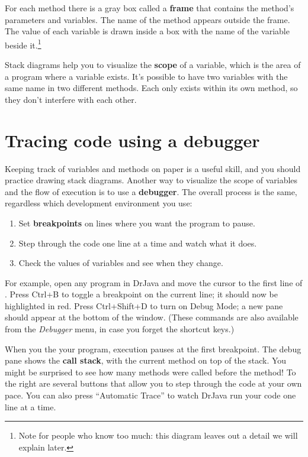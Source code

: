 
For each method there is a gray box called a {\bf frame} that contains the method's parameters and variables.
The name of the method appears outside the frame.
The value of each variable is drawn inside a box with the name of the variable beside it.\footnote{Note for people who know too much: this diagram leaves out a detail we will explain later.}

Stack diagrams help you to visualize the {\bf scope} of a variable, which is the area of a program where a variable exists.
It's possible to have two variables with the same name in two different methods.
Each only exists within its own method, so they don't interfere with each other.


\section{Tracing code using a debugger}


Keeping track of variables and methods on paper is a useful skill, and you should practice drawing stack diagrams.
Another way to visualize the scope of variables and the flow of execution is to use a {\bf debugger}.
The overall process is the same, regardless which development environment you use:


\begin{enumerate}
\item Set {\bf breakpoints} on lines where you want the program to pause.
\item Step through the code one line at a time and watch what it does.
\item Check the values of variables and see when they change.
\end{enumerate}

For example, open any program in DrJava and move the cursor to the first line of .
Press Ctrl+B to toggle a breakpoint on the current line; it should now be highlighted in red.
Press Ctrl+Shift+D to turn on Debug Mode; a new pane should appear at the bottom of the window.
(These commands are also available from the {\em Debugger} menu, in case you forget the shortcut keys.)


When you the your program, execution pauses at the first breakpoint.
The debug pane shows the {\bf call stack}, with the current method on top of the stack.
You might be surprised to see how many methods were called before the  method!
To the right are several buttons that allow you to step through the code at your own pace.
You can also press ``Automatic Trace'' to watch DrJava run your code one line at a time.

